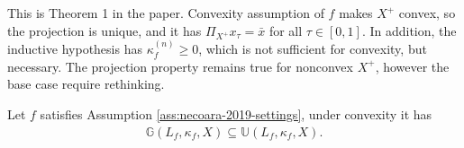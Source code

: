 \documentclass[12pt]{report}
\begin{document}
            \begin{remark}
                This is Theorem 1 in the paper. 
                Convexity assumption of $f$ makes $X^+$ convex, so the projection is unique, and it has $\Pi_{X^+}x_\tau = \bar x$ for all $\tau \in [0, 1]$. 
                In addition, the inductive hypothesis has $\kappa_f^{(n)} \ge 0$, which is not sufficient for convexity, but necessary. 
                The projection property remains true for nonconvex $X^+$, however the base case require rethinking. 
            \end{remark}
            \begin{theorem}\label{thm:qgg-implies-qua}
                Let $f$ satisfies Assumption \ref{ass:necoara-2019-settings}, under convexity it has 
                \begin{align*}
                    \mathbb G(L_f, \kappa_f, X)\subseteq \mathbb U(L_f, \kappa_f, X). 
                \end{align*}
            \end{theorem}
\end{document}
